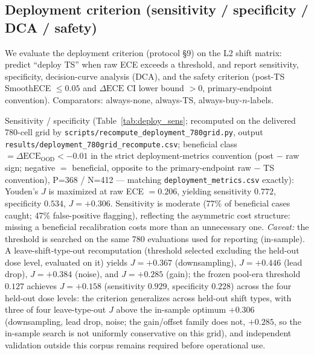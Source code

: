 \documentclass[review,12pt,nonatbib]{elsarticle}
\begin{document}
\subsection{Deployment criterion (sensitivity / specificity / DCA / safety)}
\label{sec:deployment}
We evaluate the deployment criterion (protocol \S9) on the L2 shift
matrix: predict ``deploy TS'' when raw ECE exceeds a threshold, and
report sensitivity, specificity, decision-curve analysis (DCA), and the
safety criterion (post-TS SmoothECE $\leq 0.05$ and $\Delta\text{ECE}$ CI
lower bound $>0$, primary-endpoint convention). Comparators: always-none,
always-TS, always-buy-$n$-labels.

Sensitivity / specificity (Table~\ref{tab:deploy_sens}; recomputed on the
delivered 780-cell grid by
\texttt{scripts/recompute\_deployment\_780grid.py}, output
\texttt{results/deployment\_780grid\_recompute.csv}; beneficial class
$=\Delta\text{ECE}_{\text{OOD}}<-0.01$ in the strict deployment-metrics
convention (post $-$ raw sign; negative $=$ beneficial, opposite to the
primary-endpoint raw $-$ TS convention), P=368 / N=412 --- matching \texttt{deployment\_metrics.csv}
exactly): Youden's $J$ is maximized at raw ECE $=0.206$, yielding
sensitivity $0.772$, specificity $0.534$, $J=+0.306$. Sensitivity is
moderate (77\% of beneficial cases caught; 47\% false-positive
flagging), reflecting the asymmetric cost structure: missing a
beneficial recalibration costs more than an unnecessary one.
\emph{Caveat:} the threshold is searched on the same 780 evaluations used
for reporting (in-sample). A leave-shift-type-out recomputation (threshold
selected excluding the held-out dose level, evaluated on it) yields
$J=+0.367$ (downsampling), $J=+0.446$ (lead drop), $J=+0.384$
(noise), and $J=+0.285$ (gain); the frozen pool-era threshold $0.127$
achieves $J=+0.158$ (sensitivity $0.929$, specificity $0.228$) across the
four held-out dose levels: the criterion generalizes across held-out
shift types, with three of four leave-type-out $J$ above the in-sample
optimum $+0.306$ (downsampling, lead drop, noise; the gain/offset
family does not, $+0.285$, so the in-sample search is not uniformly
conservative on this grid), and independent
validation outside this corpus remains required before operational use.
\end{document}
